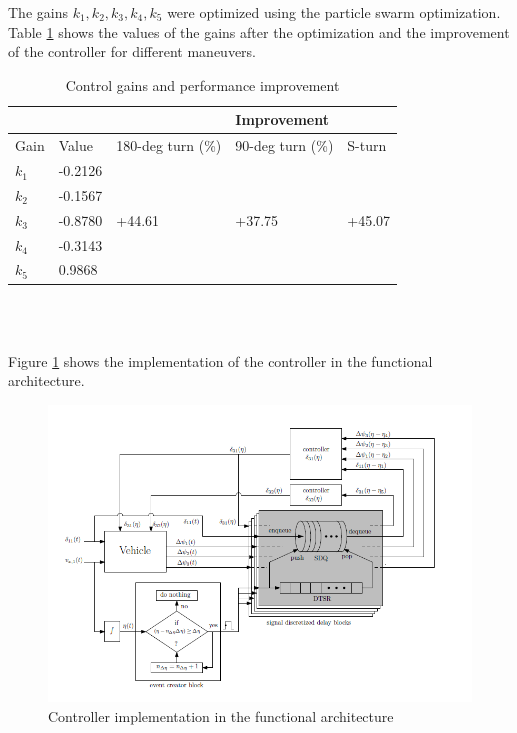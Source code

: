 \documentclass[ExampleMasters.tex]{subfiles}
\begin{document}
The gains $k_1, k_2, k_3, k_4, k_5$ were optimized using the particle swarm optimization.
Table \ref{tab:gains_after_optimization} shows the values of the gains after the optimization and the improvement of the controller for different maneuvers.
\begin{table}[h]
	\centering
	\caption{Control gains and performance improvement}
	\label{tab:gains_after_optimization}
	\begin{tabular}{l|l|l l l}
		& &  & Improvement  \\ \hline
		Gain & Value & 180-deg turn (\%) & 90-deg turn (\%) & S-turn\\ \hline
		$k_1$   &       -0.2126      &             \\
		$k_2$    &            -0.1567 &             \\
		$k_3$  &      -0.8780       &           +44.61 & +37.75 & +45.07  \\
		$k_4$ &      -0.3143       &           \\
		$k_5$  & 0.9868 & \\
		
	\end{tabular} \\
\end{table}\\
Figure \ref{fig:low_speed_diagram} shows the implementation of the controller in the functional architecture.

\begin{figure}[!htb]
	\centering
	\includegraphics[width=1.0\linewidth]{figures/Low_speed_diagram}
	\caption{Controller implementation in the functional architecture \cite{Low-speed_paper}}
	\label{fig:low_speed_diagram}
\end{figure}
\end{document}
